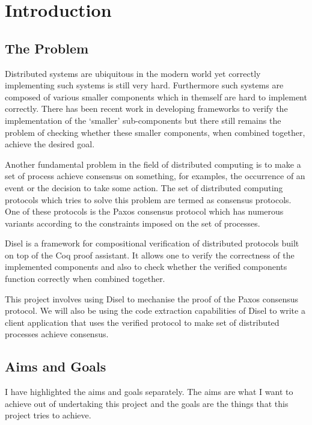 \chapter{Introduction}

\section{The Problem}
Distributed systems are ubiquitous in the modern world yet
correctly implementing such systems is still very hard. Furthermore such
systems are composed of various smaller components which in themself are
hard to implement correctly. There has been recent work in developing
frameworks to verify the implementation of the `smaller' sub-components
but there still remains the problem of checking whether these smaller
components, when combined together, achieve the desired goal.

Another fundamental problem in the field of distributed computing is to make
a set of process achieve consensus on something, for examples, the occurrence
of an event or the decision to take some action. The set of distributed
computing protocols which tries to solve this problem are termed as
consensus protocols. One of these protocols is the Paxos consensus protocol
which has numerous variants according to the constraints imposed on the
set of processes.

Disel is a framework for compositional verification of distributed
protocols built on top of the Coq proof assistant. It allows one to verify
the correctness of the implemented components and also to check whether
the verified components function correctly when combined together.

This project involves using Disel to mechanise the proof of the Paxos consensus protocol.
We will also be using the code extraction capabilities of Disel to
write a client application that uses the verified protocol to make set of
distributed processes achieve consensus.

\section{Aims and Goals}
I have highlighted the aims and goals separately. The aims are what I want to
achieve out of undertaking this project and the goals are the things that this
project tries to achieve.

